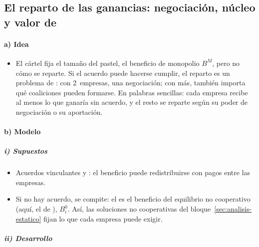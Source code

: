 \documentclass[11pt]{article}
\begin{document}
\subsection{El reparto de las ganancias: negociación, núcleo y valor de }\label{sec:reparto}

\paragraph{a) Idea}

\begin{itemize}
\item El cártel fija el tamaño del pastel, el beneficio de monopolio $B^M$, pero no cómo se reparte. Si el acuerdo puede hacerse cumplir, el reparto es un problema de  : con 2~empresas, una negociación; con más, también importa qué coaliciones pueden formarse. En palabras sencillas: cada empresa recibe al menos lo que ganaría sin acuerdo, y el resto se reparte según su poder de negociación o su aportación.
\end{itemize}

\paragraph{b) Modelo}

\subparagraph{i) Supuestos}

\begin{itemize}
\item Acuerdos vinculantes y : el beneficio puede redistribuirse con pagos entre las empresas.
\item Si no hay acuerdo, se compite: el  es el beneficio del equilibrio no cooperativo (aquí, el de ), $B_i^0$. Así, las soluciones no cooperativas del bloque~\ref{sec:analisis-estatico} fijan lo que cada empresa puede exigir.
\end{itemize}

\subparagraph{ii) Desarrollo}
\end{document}
